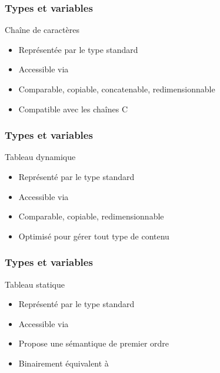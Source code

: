 \documentclass[svgnames]{beamer}
\begin{document}
\frame
{
  \frametitle{Types et variables}
  \begin{block}{Chaîne de caractères}
  \begin{itemize}
  \item Représentée par le type standard 
  \item Accessible via 
  \item Comparable, copiable, concatenable, redimensionnable
  \item Compatible avec les chaînes C
  \end{itemize}  

  \end{block}{}
}

\frame
{
  \frametitle{Types et variables}
  \begin{block}{Tableau dynamique}
  \begin{itemize}
  \item Représenté par le type standard 
  \item Accessible via 
  \item Comparable, copiable, redimensionnable
  \item Optimisé pour gérer tout type de contenu
  \end{itemize}    

  \end{block}{}
}

\frame
{
  \frametitle{Types et variables}
  \begin{block}{Tableau statique}
  \begin{itemize}
  \item Représenté par le type standard 
  \item Accessible via 
  \item Propose une sémantique de premier ordre
  \item Binairement équivalent à 
  \end{itemize}    

  \end{block}{}
}
\end{document}
